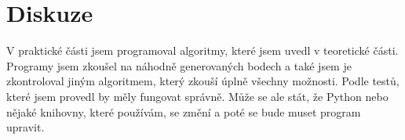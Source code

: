 \chapter{Diskuze}
\label{chap:diskuze}

V praktické části jsem programoval algoritmy, které jsem uvedl v teoretické části. Programy jsem zkoušel na náhodně generovaných bodech a také jsem je zkontroloval jiným algoritmem, který zkouší úplně všechny možnosti. Podle testů, které jsem provedl by měly fungovat správně. Může se ale stát, že Python nebo nějaké knihovny, které používám, se změní a poté se bude muset program upravit. 


